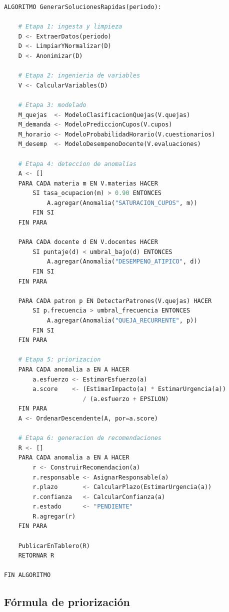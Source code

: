 \begin{lstlisting}[language=Python, caption={Algoritmo de generación de soluciones rápidas}, label={lst:algoritmo}]
ALGORITMO GenerarSolucionesRapidas(periodo):

    # Etapa 1: ingesta y limpieza
    D <- ExtraerDatos(periodo)
    D <- LimpiarYNormalizar(D)
    D <- Anonimizar(D)

    # Etapa 2: ingenieria de variables
    V <- CalcularVariables(D)

    # Etapa 3: modelado
    M_quejas  <- ModeloClasificacionQuejas(V.quejas)
    M_demanda <- ModeloPrediccionCupos(V.cupos)
    M_horario <- ModeloProbabilidadHorario(V.cuestionarios)
    M_desemp  <- ModeloDesempenoDocente(V.evaluaciones)

    # Etapa 4: deteccion de anomalias
    A <- []
    PARA CADA materia m EN V.materias HACER
        SI tasa_ocupacion(m) > 0.90 ENTONCES
            A.agregar(Anomalia("SATURACION_CUPOS", m))
        FIN SI
    FIN PARA

    PARA CADA docente d EN V.docentes HACER
        SI puntaje(d) < umbral_bajo(d) ENTONCES
            A.agregar(Anomalia("DESEMPENO_ATIPICO", d))
        FIN SI
    FIN PARA

    PARA CADA patron p EN DetectarPatrones(V.quejas) HACER
        SI p.frecuencia > umbral_frecuencia ENTONCES
            A.agregar(Anomalia("QUEJA_RECURRENTE", p))
        FIN SI
    FIN PARA

    # Etapa 5: priorizacion
    PARA CADA anomalia a EN A HACER
        a.esfuerzo <- EstimarEsfuerzo(a)
        a.score    <- (EstimarImpacto(a) * EstimarUrgencia(a))
                      / (a.esfuerzo + EPSILON)
    FIN PARA
    A <- OrdenarDescendente(A, por=a.score)

    # Etapa 6: generacion de recomendaciones
    R <- []
    PARA CADA anomalia a EN A HACER
        r <- ConstruirRecomendacion(a)
        r.responsable <- AsignarResponsable(a)
        r.plazo       <- CalcularPlazo(EstimarUrgencia(a))
        r.confianza   <- CalcularConfianza(a)
        r.estado      <- "PENDIENTE"
        R.agregar(r)
    FIN PARA

    PublicarEnTablero(R)
    RETORNAR R

FIN ALGORITMO
\end{lstlisting}

\subsection{Fórmula de priorización}

